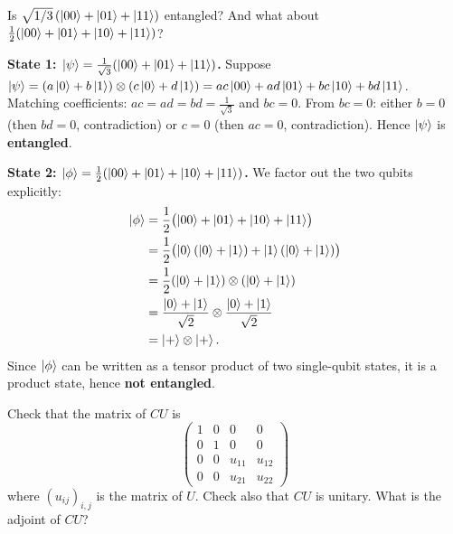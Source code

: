\documentclass{ceri/sty/rapport}
\newcounter{exercice}[section]
\begin{document}
\begin{exercice}[p.~31]
Is $\sqrt{1/3}\,(\ket{00}+\ket{01}+\ket{11})$ entangled?
And what about $\tfrac{1}{2}(\ket{00}+\ket{01}+\ket{10}+\ket{11})$?
\end{exercice}

\begin{solution}
\textbf{State 1: $\ket{\psi}=\frac{1}{\sqrt{3}}(\ket{00}+\ket{01}+\ket{11})$.}
Suppose $\ket{\psi}=(a\ket{0}+b\ket{1})\otimes(c\ket{0}+d\ket{1})=ac\ket{00}+ad\ket{01}+bc\ket{10}+bd\ket{11}$.
Matching coefficients: $ac=ad=bd=\tfrac{1}{\sqrt{3}}$ and $bc=0$.
From $bc=0$: either $b=0$ (then $bd=0$, contradiction) or $c=0$ (then $ac=0$, contradiction).
Hence $\ket{\psi}$ is \textbf{entangled}.

\medskip\noindent
\textbf{State 2: $\ket{\phi}=\tfrac{1}{2}(\ket{00}+\ket{01}+\ket{10}+\ket{11})$.}
We factor out the two qubits explicitly:
\begin{align*}
  \ket{\phi}
  &= \frac{1}{2}\bigl(\ket{00}+\ket{01}+\ket{10}+\ket{11}\bigr)\\
  &= \frac{1}{2}\bigl(\ket{0}(\ket{0}+\ket{1})+\ket{1}(\ket{0}+\ket{1})\bigr)\\
  &= \frac{1}{2}(\ket{0}+\ket{1})\otimes(\ket{0}+\ket{1})\\
  &= \frac{\ket{0}+\ket{1}}{\sqrt{2}}\otimes\frac{\ket{0}+\ket{1}}{\sqrt{2}}\\
  &= \ket{+}\otimes\ket{+}.
\end{align*}
Since $\ket{\phi}$ can be written as a tensor product of two single-qubit states,
it is a product state, hence \textbf{not entangled}.
\end{solution}

\begin{exercice}[p.~34]
Check that the matrix of $CU$ is
\[
  \begin{pmatrix}
    1 & 0 & 0           & 0           \\
    0 & 1 & 0           & 0           \\
    0 & 0 & u_{11}      & u_{12}      \\
    0 & 0 & u_{21}      & u_{22}
  \end{pmatrix}
\]
where $(u_{ij})_{i,j}$ is the matrix of $U$.
Check also that $CU$ is unitary. What is the adjoint of $CU$?
\end{exercice}
\end{document}
